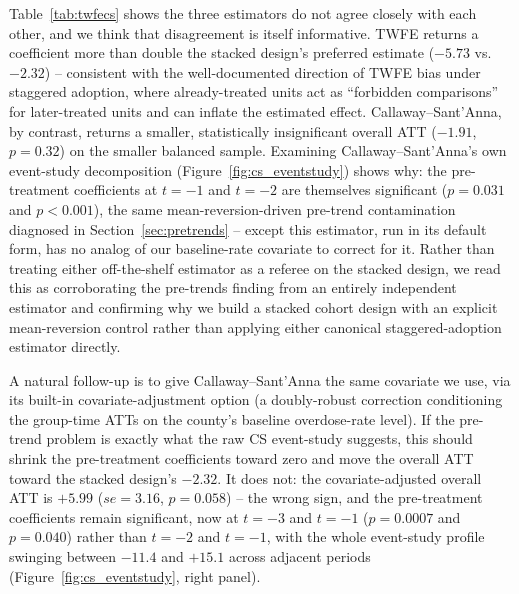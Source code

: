 \documentclass[preprint,12pt,authoryear]{elsarticle}
\begin{document}
Table~\ref{tab:twfecs} shows the three estimators do not agree closely
with each other, and we think that disagreement is itself informative.
TWFE returns a coefficient more than double the stacked design's
preferred estimate ($-5.73$ vs.\ $-2.32$) -- consistent with the
well-documented direction of TWFE bias under staggered adoption, where
already-treated units act as ``forbidden comparisons'' for later-treated
units and can inflate the estimated effect. Callaway--Sant'Anna, by
contrast, returns a smaller, statistically insignificant overall ATT
($-1.91$, $p=0.32$) on the smaller balanced sample. Examining
Callaway--Sant'Anna's own event-study decomposition
(Figure~\ref{fig:cs_eventstudy}) shows why: the pre-treatment
coefficients at $t=-1$ and $t=-2$ are themselves significant
($p=0.031$ and $p<0.001$), the same mean-reversion-driven pre-trend
contamination diagnosed in Section~\ref{sec:pretrends} -- except this
estimator, run in its default form, has no analog of our baseline-rate
covariate to correct for it. Rather than treating either off-the-shelf
estimator as a referee on the stacked design, we read this as
corroborating the pre-trends finding from an entirely independent
estimator and confirming why we build a stacked cohort design with an
explicit mean-reversion control rather than applying either canonical
staggered-adoption estimator directly.

A natural follow-up is to give Callaway--Sant'Anna the same covariate
we use, via its built-in covariate-adjustment option (a doubly-robust
correction conditioning the group-time ATTs on the county's baseline
overdose-rate level). If the pre-trend problem is exactly what the raw
CS event-study suggests, this should shrink the pre-treatment
coefficients toward zero and move the overall ATT toward the stacked
design's $-2.32$. It does not: the covariate-adjusted overall ATT is
$+5.99$ ($se=3.16$, $p=0.058$) -- the wrong sign, and the pre-treatment
coefficients remain significant, now at $t=-3$ and $t=-1$
($p=0.0007$ and $p=0.040$) rather than $t=-2$ and $t=-1$, with the
whole event-study profile swinging between $-11.4$ and $+15.1$ across
adjacent periods (Figure~\ref{fig:cs_eventstudy}, right panel).
\end{document}
